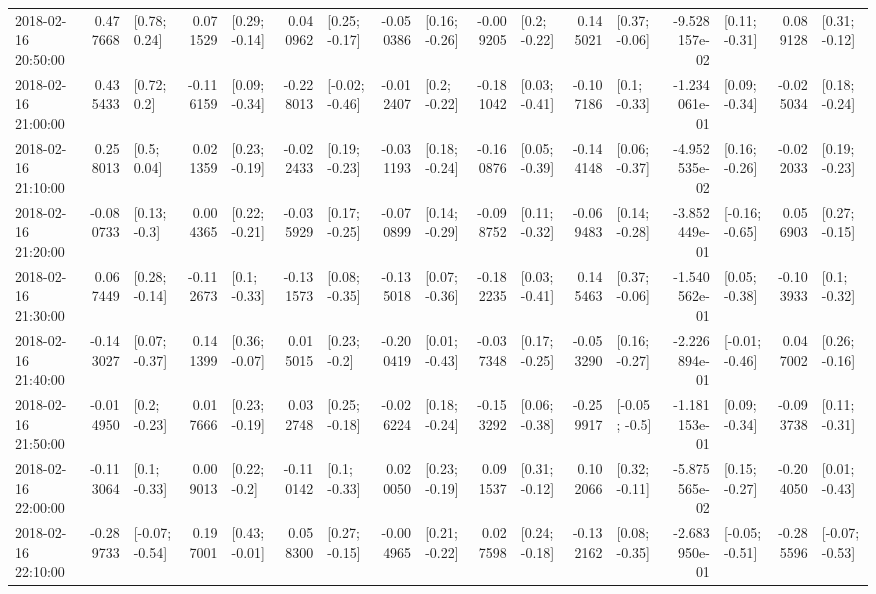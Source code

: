\begin{tabular}{lrlrlrlrlrlrlrlrl}
2018-02-16 20:50:00 &  0.477668 &    [0.78; 0.24] &  0.071529 &   [0.29; -0.14] &  0.040962 &   [0.25; -0.17] & -0.050386 &   [0.16; -0.26] & -0.009205 &    [0.2; -0.22] &  0.145021 &   [0.37; -0.06] & -9.528157e-02 &   [0.11; -0.31] &  0.089128 &   [0.31; -0.12] \\
2018-02-16 21:00:00 &  0.435433 &     [0.72; 0.2] & -0.116159 &   [0.09; -0.34] & -0.228013 &  [-0.02; -0.46] & -0.012407 &    [0.2; -0.22] & -0.181042 &   [0.03; -0.41] & -0.107186 &    [0.1; -0.33] & -1.234061e-01 &   [0.09; -0.34] & -0.025034 &   [0.18; -0.24] \\
2018-02-16 21:10:00 &  0.258013 &     [0.5; 0.04] &  0.021359 &   [0.23; -0.19] & -0.022433 &   [0.19; -0.23] & -0.031193 &   [0.18; -0.24] & -0.160876 &   [0.05; -0.39] & -0.144148 &   [0.06; -0.37] & -4.952535e-02 &   [0.16; -0.26] & -0.022033 &   [0.19; -0.23] \\
2018-02-16 21:20:00 & -0.080733 &    [0.13; -0.3] &  0.004365 &   [0.22; -0.21] & -0.035929 &   [0.17; -0.25] & -0.070899 &   [0.14; -0.29] & -0.098752 &   [0.11; -0.32] & -0.069483 &   [0.14; -0.28] & -3.852449e-01 &  [-0.16; -0.65] &  0.056903 &   [0.27; -0.15] \\
2018-02-16 21:30:00 &  0.067449 &   [0.28; -0.14] & -0.112673 &    [0.1; -0.33] & -0.131573 &   [0.08; -0.35] & -0.135018 &   [0.07; -0.36] & -0.182235 &   [0.03; -0.41] &  0.145463 &   [0.37; -0.06] & -1.540562e-01 &   [0.05; -0.38] & -0.103933 &    [0.1; -0.32] \\
2018-02-16 21:40:00 & -0.143027 &   [0.07; -0.37] &  0.141399 &   [0.36; -0.07] &  0.015015 &    [0.23; -0.2] & -0.200419 &   [0.01; -0.43] & -0.037348 &   [0.17; -0.25] & -0.053290 &   [0.16; -0.27] & -2.226894e-01 &  [-0.01; -0.46] &  0.047002 &   [0.26; -0.16] \\
2018-02-16 21:50:00 & -0.014950 &    [0.2; -0.23] &  0.017666 &   [0.23; -0.19] &  0.032748 &   [0.25; -0.18] & -0.026224 &   [0.18; -0.24] & -0.153292 &   [0.06; -0.38] & -0.259917 &   [-0.05; -0.5] & -1.181153e-01 &   [0.09; -0.34] & -0.093738 &   [0.11; -0.31] \\
2018-02-16 22:00:00 & -0.113064 &    [0.1; -0.33] &  0.009013 &    [0.22; -0.2] & -0.110142 &    [0.1; -0.33] &  0.020050 &   [0.23; -0.19] &  0.091537 &   [0.31; -0.12] &  0.102066 &   [0.32; -0.11] & -5.875565e-02 &   [0.15; -0.27] & -0.204050 &   [0.01; -0.43] \\
2018-02-16 22:10:00 & -0.289733 &  [-0.07; -0.54] &  0.197001 &   [0.43; -0.01] &  0.058300 &   [0.27; -0.15] & -0.004965 &   [0.21; -0.22] &  0.027598 &   [0.24; -0.18] & -0.132162 &   [0.08; -0.35] & -2.683950e-01 &  [-0.05; -0.51] & -0.285596 &  [-0.07; -0.53] \\

\end{tabular}
